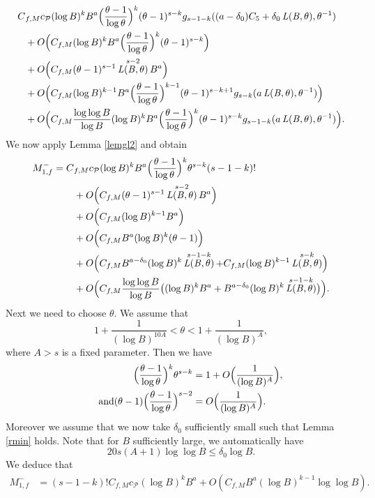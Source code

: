 \documentclass[11pt]{article}
\numberwithin{equation}{section}
\DeclareMathOperator{\LBt}{\mathit{L(B,\theta)}}
\let\del\delta
\let\tet\theta
\newcommand{\calP}{\mathcal{P}}
\theoremstyle{definition}
\numberwithin{theorem}{section}
\begin{document}
\begin{equation*}
\begin{split}
C&_{f,M}c_{\calP} (\log B)^kB^{a} \Bigl(\frac{\tet -1}{\log \tet}\Bigr)^k (\tet-1)^{s-k} g_{s-1-k}((a-\del_0) C_5 + \del_0 \LBt, \tet^{-1}) \\
&+O\Bigl(C_{f,M} (\log B)^kB^{a} \Bigl(\frac{\tet -1}{\log \tet}\Bigr)^k (\tet-1)^{s-k}\Bigr)\\
&+O\Bigl(C_{f,M} (\tet -1)^{s-1} \LBt^{s-2} B^{a} \Bigr)\\
&+O\Bigl(C_{f,M} (\log B)^{k-1} B^{a} \Bigl(\frac{\tet -1}{\log \tet}\Bigr)^{k-1}(\tet-1)^{s-k+1} g_{s-k}(a \LBt, \tet^{-1}) \Bigr)\\
&+O\Bigl(C_{f,M}\frac{\log \log B}{\log B} (\log B)^kB^{a} \Bigl(\frac{\tet -1}{\log \tet}\Bigr)^k (\tet-1)^{s-k} g_{s-1-k}(a\LBt, \tet^{-1})\Bigr).
\end{split}
\end{equation*}
We now apply Lemma \ref{lemgl2} and obtain
\begin{equation*}
\begin{split}
M_{1,f}^- = C&_{f,M}c_{\calP} (\log B)^kB^{a} \Bigl(\frac{\tet -1}{\log \tet}\Bigr)^k \tet^{s-k} (s-1-k)!\\
&+O\Bigl(C_{f,M} (\tet -1)^{s-1} \LBt^{s-2} B^{a} \Bigr)\\
&+O\Bigl(C_{f,M} (\log B)^{k-1} B^{a} \Bigr)\\
&+O\Bigl(C_{f,M} B^{a} (\log B)^k (\tet-1)\Bigr)\\
&+ O\Bigl(C_{f,M} B^{a-\del_0}(\log B)^k \LBt^{s-1-k} + C_{f,M} (\log B)^{k-1} \LBt^{s-k} \Bigr)\\
&+O\Bigl(C_{f,M} \frac{\log\log B}{\log B}\bigl((\log B)^kB^{a}+ B^{a-\del_0}(\log B)^k \LBt^{s-1-k} \bigr) \Bigr).
\end{split}
\end{equation*}
Next we need to choose $\tet$. We assume that
\begin{equation}\label{eqn80b}
1+\frac{1}{(\log B)^{10A}}<\tet< 1+\frac{1}{(\log B)^A},
\end{equation}
where $A>s$ is a fixed parameter. Then we have
\begin{align*}
\Bigl(\frac{\tet -1}{\log \tet}\Bigr)^k \tet^{s-k}&= 1+O\Bigl(\frac{1}{(\log B)^A}\Bigr),
\\
\tag*{and}
(\tet-1) \Bigl(\frac{\tet -1}{\log \tet}\Bigr)^{s-2} &= O\Bigl(\frac{1}{(\log B)^A}\Bigr).
\end{align*}
Moreover we assume that we now take $\del_0$ sufficiently small such that Lemma \ref{rmin} holds. Note that for $B$ sufficiently large, we automatically have
\[
20s (A+1) \log \log B\leq \del_0 \log B.
\]
We deduce that
\begin{equation*}
\begin{split}
M_{1,f}^- &= (s-1-k)! C_{f,M}c_{\calP} (\log B)^kB^{a} +O\left(C_{f,M} B^{a} (\log B)^{k-1} \log \log B \right).
\end{split}
\end{equation*}
\end{document}
